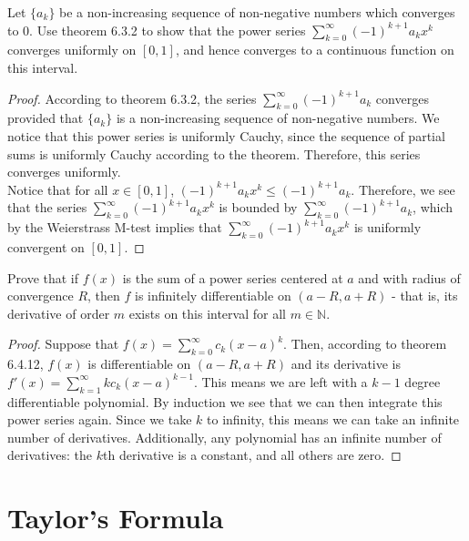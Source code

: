 \documentclass[12pt]{book}
\newcommand{\N}{\mathbb{N}}
\newenvironment{exercise}[2][Exercise]{\begin{trivlist}
\item[\hskip \labelsep {\bfseries #1}\hskip \labelsep {\bfseries #2.}]}{\end{trivlist}}
\begin{document}
\begin{exercise}{6.4.10}
Let $\{a_k\}$ be a non-increasing sequence of non-negative numbers which converges to 0. Use theorem 6.3.2 to show that the power series $\sum_{k=0}^\infty (-1)^{k+1} a_k x^k$ converges uniformly on $[0,1]$, and hence converges to a continuous function on this interval.

    \begin{proof}
    According to theorem 6.3.2, the series $\sum_{k=0}^\infty \left(-1\right)^{k+1} a_k$ converges provided that $\{a_k\}$ is a non-increasing sequence of non-negative numbers. We notice that this power series is uniformly Cauchy, since the sequence of partial sums is uniformly Cauchy according to the theorem. Therefore, this series converges uniformly. \\
    Notice that for all $x \in [0,1]$, $\left(-1\right)^{k+1} a_k x^k \leq \left(-1\right)^{k+1} a_k$. Therefore, we see that the series $\sum_{k=0}^\infty (-1)^{k+1} a_k x^k$  is bounded by $\sum_{k=0}^\infty (-1)^{k+1} a_k$, which by the Weierstrass M-test implies that $\sum_{k=0}^\infty (-1)^{k+1} a_k x^k$  is uniformly convergent on $[0,1]$.
    \end{proof}
\end{exercise}



\begin{exercise}{6.4.12}
Prove that if $f(x)$ is the sum of a power series centered at $a$ and with radius of convergence $R$, then $f$ is infinitely differentiable on $(a-R,a+R)$ - that is, its derivative of order $m$ exists on this interval for all $m \in \N$.

   \begin{proof}
   Suppose that $f(x) = \sum_{k=0}^\infty c_k \left( x-a\right)^k$. Then, according to theorem 6.4.12, $f(x)$ is differentiable on $\left(a-R, a+R\right)$ and its derivative is $f'(x) = \sum_{k=1}^\infty k c_k \left( x-a\right)^{k-1} $. This means we are left with a $k-1$ degree differentiable polynomial. By induction we see that we can then integrate this power series again. Since we take $k$ to infinity, this means we can take an infinite number of derivatives. Additionally, any polynomial has an infinite number of derivatives: the $k$th derivative is a constant, and all others are zero.
   \end{proof}
\end{exercise}

\section{Taylor's Formula}
\end{document}
